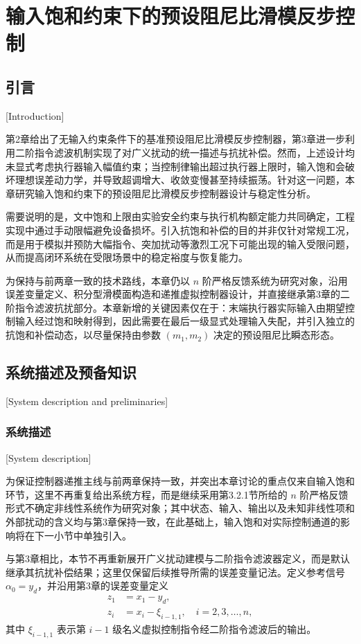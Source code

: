 
\chapter{输入饱和约束下的预设阻尼比滑模反步控制}

\section{引言}[Introduction]

第2章给出了无输入约束条件下的基准预设阻尼比滑模反步控制器，第3章进一步利用二阶指令滤波机制实现了对广义扰动的统一描述与抗扰补偿。然而，上述设计均未显式考虑执行器输入幅值约束；当控制律输出超过执行器上限时，输入饱和会破坏理想误差动力学，并导致超调增大、收敛变慢甚至持续振荡。针对这一问题，本章研究输入饱和约束下的预设阻尼比滑模反步控制器设计与稳定性分析。

需要说明的是，文中饱和上限由实验安全约束与执行机构额定能力共同确定，工程实现中通过手动限幅避免设备损坏。引入抗饱和补偿的目的并非仅针对常规工况，而是用于模拟并预防大幅指令、突加扰动等激烈工况下可能出现的输入受限问题，从而提高闭环系统在受限场景中的稳定裕度与恢复能力。

为保持与前两章一致的技术路线，本章仍以 $n$ 阶严格反馈系统为研究对象，沿用误差变量定义、积分型滑模面构造和递推虚拟控制器设计，并直接继承第3章的二阶指令滤波抗扰部分。本章新增的关键因素仅在于：末端执行器实际输入由期望控制输入经过饱和映射得到，因此需要在最后一级显式处理输入失配，并引入独立的抗饱和补偿动态，以尽量保持由参数 $(m_1,m_2)$ 决定的预设阻尼比瞬态形态。

\section{系统描述及预备知识}[System description and preliminaries]

\subsection{系统描述}[System description]

为保证控制器递推主线与前两章保持一致，并突出本章讨论的重点仅来自输入饱和环节，这里不再重复给出系统方程，而是继续采用第3.2.1节所给的 $n$ 阶严格反馈形式不确定非线性系统作为研究对象；其中状态、输入、输出以及未知非线性项和外部扰动的含义均与第3章保持一致，在此基础上，输入饱和对实际控制通道的影响将在下一小节中单独引入。

与第3章相比，本节不再重新展开广义扰动建模与二阶指令滤波器定义，而是默认继承其抗扰补偿结果；这里仅保留后续推导所需的误差变量记法。定义参考信号 $\alpha_0=y_d$，并沿用第3章的误差变量定义
\begin{subequations}
\begin{align}
z_1&=x_1-y_d,\\
z_i&=x_i-\xi_{i-1,1},\quad i=2,3,\ldots,n,
\end{align}
\end{subequations}
其中 $\xi_{i-1,1}$ 表示第 $i-1$ 级名义虚拟控制指令经二阶指令滤波后的输出。

